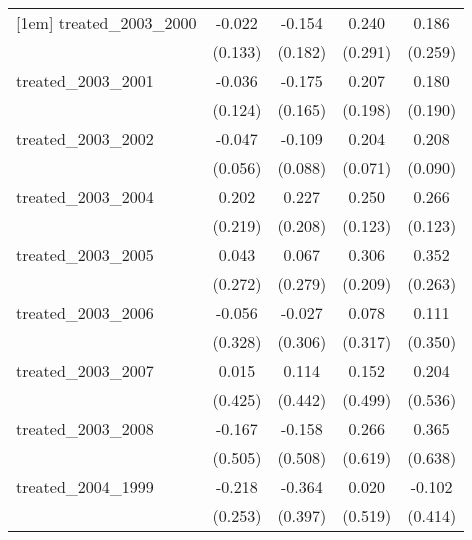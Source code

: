 {\begin{tabular}{l*{4}{c}}
[1em]
treated\_2003\_2000&      -0.022         &      -0.154         &       0.240         &       0.186         \\
            &     (0.133)         &     (0.182)         &     (0.291)         &     (0.259)         \\
[1em]
treated\_2003\_2001&      -0.036         &      -0.175         &       0.207         &       0.180         \\
            &     (0.124)         &     (0.165)         &     (0.198)         &     (0.190)         \\
[1em]
treated\_2003\_2002&      -0.047         &      -0.109         &       0.204\sym{**} &       0.208\sym{*}  \\
            &     (0.056)         &     (0.088)         &     (0.071)         &     (0.090)         \\
[1em]
treated\_2003\_2004&       0.202         &       0.227         &       0.250\sym{*}  &       0.266\sym{*}  \\
            &     (0.219)         &     (0.208)         &     (0.123)         &     (0.123)         \\
[1em]
treated\_2003\_2005&       0.043         &       0.067         &       0.306         &       0.352         \\
            &     (0.272)         &     (0.279)         &     (0.209)         &     (0.263)         \\
[1em]
treated\_2003\_2006&      -0.056         &      -0.027         &       0.078         &       0.111         \\
            &     (0.328)         &     (0.306)         &     (0.317)         &     (0.350)         \\
[1em]
treated\_2003\_2007&       0.015         &       0.114         &       0.152         &       0.204         \\
            &     (0.425)         &     (0.442)         &     (0.499)         &     (0.536)         \\
[1em]
treated\_2003\_2008&      -0.167         &      -0.158         &       0.266         &       0.365         \\
            &     (0.505)         &     (0.508)         &     (0.619)         &     (0.638)         \\
[1em]
treated\_2004\_1999&      -0.218         &      -0.364         &       0.020         &      -0.102         \\
            &     (0.253)         &     (0.397)         &     (0.519)         &     (0.414)         \\

\end{tabular}}
